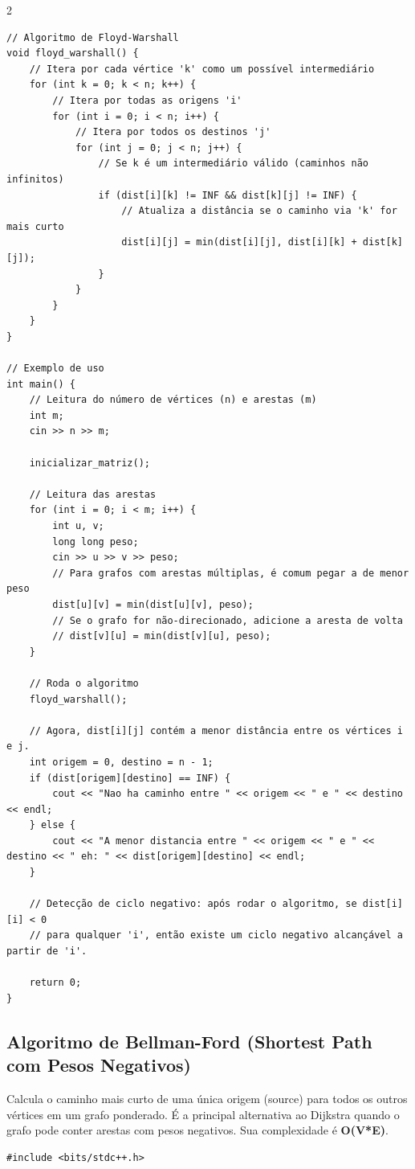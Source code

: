 \documentclass[11pt]{article}
\begin{document}
\begin{multicols}{2}
\begin{lstlisting}
// Algoritmo de Floyd-Warshall
void floyd_warshall() {
    // Itera por cada vértice 'k' como um possível intermediário
    for (int k = 0; k < n; k++) {
        // Itera por todas as origens 'i'
        for (int i = 0; i < n; i++) {
            // Itera por todos os destinos 'j'
            for (int j = 0; j < n; j++) {
                // Se k é um intermediário válido (caminhos não infinitos)
                if (dist[i][k] != INF && dist[k][j] != INF) {
                    // Atualiza a distância se o caminho via 'k' for mais curto
                    dist[i][j] = min(dist[i][j], dist[i][k] + dist[k][j]);
                }
            }
        }
    }
}

// Exemplo de uso
int main() {
    // Leitura do número de vértices (n) e arestas (m)
    int m;
    cin >> n >> m;

    inicializar_matriz();

    // Leitura das arestas
    for (int i = 0; i < m; i++) {
        int u, v;
        long long peso;
        cin >> u >> v >> peso;
        // Para grafos com arestas múltiplas, é comum pegar a de menor peso
        dist[u][v] = min(dist[u][v], peso);
        // Se o grafo for não-direcionado, adicione a aresta de volta
        // dist[v][u] = min(dist[v][u], peso);
    }

    // Roda o algoritmo
    floyd_warshall();

    // Agora, dist[i][j] contém a menor distância entre os vértices i e j.
    int origem = 0, destino = n - 1;
    if (dist[origem][destino] == INF) {
        cout << "Nao ha caminho entre " << origem << " e " << destino << endl;
    } else {
        cout << "A menor distancia entre " << origem << " e " << destino << " eh: " << dist[origem][destino] << endl;
    }
    
    // Detecção de ciclo negativo: após rodar o algoritmo, se dist[i][i] < 0
    // para qualquer 'i', então existe um ciclo negativo alcançável a partir de 'i'.

    return 0;
}
\end{lstlisting}

\subsection{Algoritmo de Bellman-Ford (Shortest Path com Pesos Negativos)}
Calcula o caminho mais curto de uma única origem (source) para todos os outros vértices em um grafo ponderado. É a principal alternativa ao Dijkstra quando o grafo pode conter arestas com pesos negativos. Sua complexidade é \textbf{O(V*E)}.
\begin{lstlisting}
#include <bits/stdc++.h>


\end{lstlisting}
\end{multicols}
\end{document}
